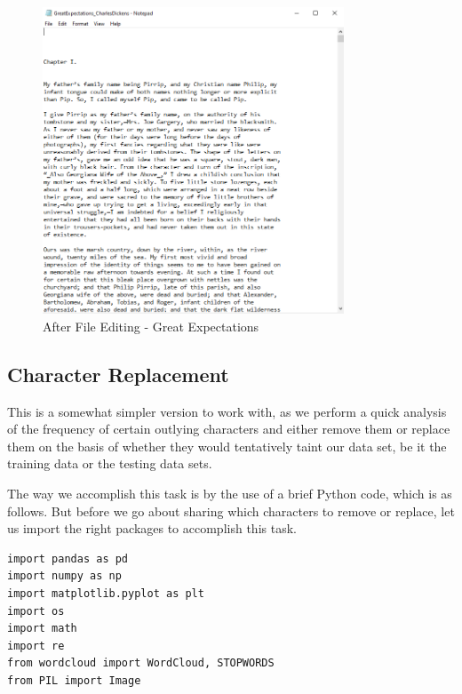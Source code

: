 \begin{figure}[H]
	\begin{center}
		\includegraphics[width = 0.8\textwidth]{Images/data_clean_final.PNG} %
		\caption{After File Editing - Great Expectations}
		\label{fig:data-clean-final}
	\end{center}
\end{figure}


\subsection{Character Replacement}
\label{sec:data-clean-coding}

This is a somewhat simpler version to work with, as we perform a quick analysis of the frequency of certain outlying characters and either remove them or replace them on the basis of whether they would tentatively taint our data set, be it the training data or the testing data sets.

The way we accomplish this task is by the use of a brief Python code, which is as follows. But before we go about sharing which characters to remove or replace, let us import the right packages to accomplish this task.

\begin{code}
\label{code:libraries}
\begin{verbatim}
import pandas as pd
import numpy as np
import matplotlib.pyplot as plt
import os
import math
import re
from wordcloud import WordCloud, STOPWORDS
from PIL import Image
\end{verbatim}
\caption{List of all libraries used in the Dissertation}
\end{code}

